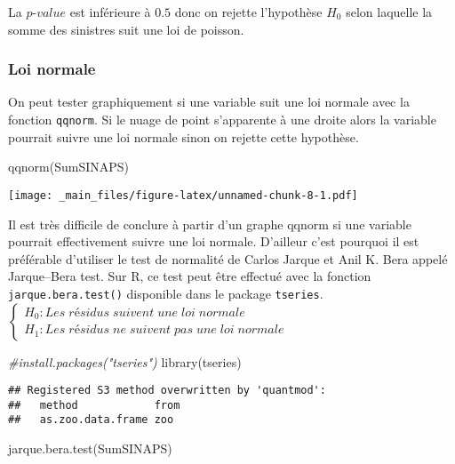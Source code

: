 \documentclass[
]{book}
\newenvironment{Shaded}{\begin{snugshade}}{\end{snugshade}}
\newcommand{\CommentTok}[1]{\textcolor[rgb]{0.56,0.35,0.01}{\textit{#1}}}
\newcommand{\FunctionTok}[1]{\textcolor[rgb]{0.00,0.00,0.00}{#1}}
\newcommand{\NormalTok}[1]{#1}
\theoremstyle{definition}
\theoremstyle{definition}
\theoremstyle{definition}
\theoremstyle{definition}
\theoremstyle{remark}
\begin{document}
La \(p\)-\(value\) est inférieure à \(0.5\) donc on rejette l'hypothèse \(H_0\) selon laquelle la somme des sinistres suit une loi de poisson.

\hypertarget{loi-normale}{%
\subsubsection{Loi normale}\label{loi-normale}}

On peut tester graphiquement si une variable suit une loi normale avec la fonction \texttt{qqnorm}. Si le nuage de point s'apparente à une droite alors la variable pourrait suivre une loi normale sinon on rejette cette hypothèse.

\begin{Shaded}
\begin{Highlighting}[]
\FunctionTok{qqnorm}\NormalTok{(SumSINAPS)}
\end{Highlighting}
\end{Shaded}

\texttt{[image: \_main\_files/figure-latex/unnamed-chunk-8-1.pdf]}

Il est très difficile de conclure à partir d'un graphe qqnorm si une variable pourrait effectivement suivre une loi normale. D'ailleur c'est pourquoi il est préférable d'utiliser le test de normalité de Carlos Jarque et Anil K. Bera appelé Jarque--Bera test. Sur R, ce test peut être effectué avec la fonction \texttt{jarque.bera.test()} disponible dans le package \texttt{tseries}.
\(\begin{cases}  H_0: Les\; résidus\; suivent\; une\; loi\; normale\\  H_1: Les \;résidus\; ne\; suivent\; pas\; une\; loi\; normale \end{cases}\)

\begin{Shaded}
\begin{Highlighting}[]
\CommentTok{\#install.packages("tseries")}
\FunctionTok{library}\NormalTok{(tseries)}
\end{Highlighting}
\end{Shaded}

\begin{verbatim}
## Registered S3 method overwritten by 'quantmod':
##   method            from
##   as.zoo.data.frame zoo
\end{verbatim}

\begin{Shaded}
\begin{Highlighting}[]
\FunctionTok{jarque.bera.test}\NormalTok{(SumSINAPS)}
\end{Highlighting}
\end{Shaded}
\end{document}
